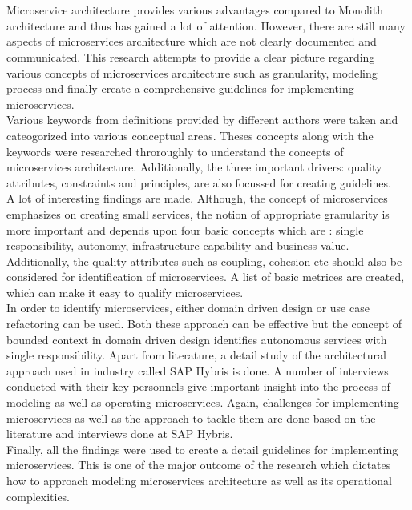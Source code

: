 \chapter{\abstractname}
Microservice architecture provides various advantages compared to Monolith architecture and thus has gained a lot of attention. However, there are still many aspects of microservices architecture which are not clearly documented and communicated. This research attempts to provide a clear picture regarding various concepts of microservices architecture such as granularity, modeling process and finally create a comprehensive guidelines for implementing microservices.\\
Various keywords from definitions provided by different authors were taken and cateogorized into various conceptual areas. Theses concepts along with the keywords were researched throroughly to understand the concepts of microservices architecture. Additionally, the three important drivers: quality attributes, constraints and principles, are also focussed for creating guidelines.\\
A lot of interesting findings are made. Although, the concept of microservices emphasizes on creating small services, the notion of appropriate granularity is more important and depends upon four basic concepts which are : single responsibility, autonomy, infrastructure capability and business value. Additionally, the quality attributes such as coupling, cohesion etc should also be considered for identification of microservices. A list of basic metrices are created, which can make it easy to qualify microservices.\\
In order to identify microservices, either domain driven design or use case refactoring can be used. Both these approach can be effective but the concept of bounded context in domain driven design identifies autonomous services with single responsibility. Apart from literature, a detail study of the architectural approach used in industry called SAP Hybris is done. A number of interviews conducted with their key personnels give important insight into the process of modeling as well as operating microservices. Again, challenges for implementing microservices as well as the approach to tackle them are done based on the literature and interviews done at SAP Hybris.\\
Finally, all the findings were used to create a detail guidelines for implementing microservices. This is one of the major outcome of the research which dictates how to approach modeling microservices architecture as well as its operational complexities.